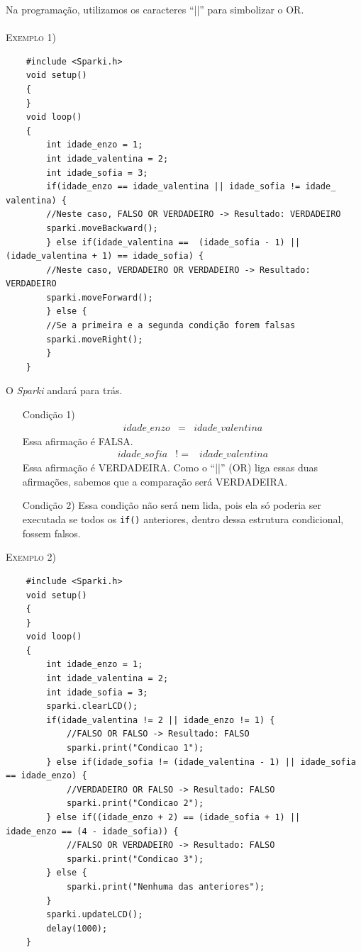    Na programação, utilizamos os caracteres ``||'' para simbolizar o OR.
    \\
    \\
    
    \textsc{Exemplo 1)}
     
     \begin{verbatim}
    #include <Sparki.h>
    void setup()
    {
    }
    void loop()
    {
        int idade_enzo = 1;
        int idade_valentina = 2;
        int idade_sofia = 3;
        if(idade_enzo == idade_valentina || idade_sofia != idade_ valentina) {
        //Neste caso, FALSO OR VERDADEIRO -> Resultado: VERDADEIRO
        sparki.moveBackward();
        } else if(idade_valentina ==  (idade_sofia - 1) || (idade_valentina + 1) == idade_sofia) {
        //Neste caso, VERDADEIRO OR VERDADEIRO -> Resultado: VERDADEIRO
        sparki.moveForward();
        } else {
        //Se a primeira e a segunda condição forem falsas
        sparki.moveRight();
        }
    }
    \end{verbatim}
    
    O \textsl{Sparki} andará para trás.
    \begin{itemize}
        \item[Condição 1)] 
        \begin{eqnarray}
        idade\_enzo & = & idade\_valentina
        \end{eqnarray}
        Essa afirmação é FALSA.
        \begin{eqnarray}
        idade\_sofia & != & idade\_valentina
        \end{eqnarray}
        Essa afirmação é VERDADEIRA. Como o ``||'' (OR) liga essas duas afirmações, sabemos que a comparação será VERDADEIRA.
        \item[Condição 2)] Essa condição não será nem lida, pois ela só poderia ser executada se todos os \texttt{if()} anteriores, dentro dessa estrutura condicional, fossem falsos.
    \end{itemize}

    \textsc{Exemplo 2)}
     
    \begin{verbatim}
    #include <Sparki.h>
    void setup()
    {
    }
    void loop()
    {
        int idade_enzo = 1;
        int idade_valentina = 2;
        int idade_sofia = 3;
        sparki.clearLCD();
        if(idade_valentina != 2 || idade_enzo != 1) {
            //FALSO OR FALSO -> Resultado: FALSO
            sparki.print("Condicao 1");
        } else if(idade_sofia != (idade_valentina - 1) || idade_sofia == idade_enzo) {
            //VERDADEIRO OR FALSO -> Resultado: FALSO
            sparki.print("Condicao 2");
        } else if((idade_enzo + 2) == (idade_sofia + 1) ||     idade_enzo == (4 - idade_sofia)) {
            //FALSO OR VERDADEIRO -> Resultado: FALSO
            sparki.print("Condicao 3");
        } else {
            sparki.print("Nenhuma das anteriores");
        }
        sparki.updateLCD();
        delay(1000);
    }
    \end{verbatim}
    
